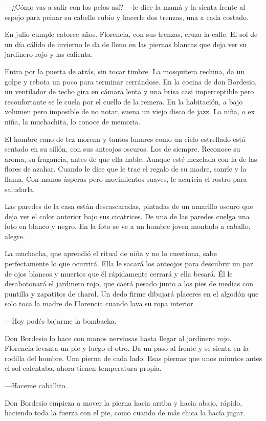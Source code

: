 \documentclass[11pt,twoside,openright]{book}
\begin{document}
—¿Cómo vas a salir con los pelos así? —le dice la mamá y la sienta frente al espejo para peinar su cabello rubio y hacerle dos trenzas, una a cada costado.

En julio cumple catorce años. Florencia, con sus trenzas, cruza la calle. El sol de un día cálido de invierno le da de lleno en las piernas blancas que deja ver su jardinero rojo y las calienta.

Entra por la puerta de atrás, sin tocar timbre. La mosquitera rechina, da un golpe y rebota un poco para terminar cerrándose. En la cocina de don Bordesio, un ventilador de techo gira en cámara lenta y una brisa casi imperceptible pero reconfortante se le cuela por el cuello de la remera. En la habitación, a bajo volumen pero imposible de no notar, suena un viejo disco de jazz. La niña, o ex niña, la muchachita, lo conoce de memoria.

El hombre cano de tez morena y tantos lunares como un cielo estrellado está sentado en su sillón, con sus anteojos oscuros. Los de siempre. Reconoce su aroma, su fragancia, antes de que ella hable. Aunque esté mezclada con la de las flores de azahar. Cuando le dice que le trae el regalo de su madre, sonríe y la llama. Con manos ásperas pero movimientos suaves, le acaricia el rostro para saludarla.

Las paredes de la casa están descascaradas, pintadas de un amarillo oscuro que deja ver el color anterior bajo sus cicatrices. De una de las paredes cuelga una foto en blanco y negro. En la foto se ve a un hombre joven montado a caballo, alegre.

La muchacha, que aprendió el ritual de niña y no lo cuestiona, sabe perfectamente lo que ocurrirá. Ella le sacará los anteojos para descubrir un par de ojos blancos y muertos que él rápidamente cerrará y ella besará. Él le desabotonará el jardinero rojo, que caerá pesado junto a los pies de medias con puntilla y zapatitos de charol. Un dedo firme dibujará placeres en el algodón que solo toca la madre de Florencia cuando lava su ropa interior.

—Hoy podés bajarme la bombacha.

Don Bordesio lo hace con manos nerviosas hasta llegar al jardinero rojo. Florencia levanta un pie y luego el otro. Da un paso al frente y se sienta en la rodilla del hombre. Una pierna de cada lado. Esas piernas que unos minutos antes el sol calentaba, ahora tienen temperatura propia.

—Haceme caballito.

Don Bordesio empieza a mover la pierna hacia arriba y hacia abajo, rápido, haciendo toda la fuerza con el pie, como cuando de más chica la hacía jugar.
\end{document}
